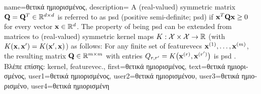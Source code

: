 {name={\foreignlanguage{greek}{θετικά ημιορισμένος}},
	description=
	{A (real-valued) symmetric matrix $\mathbf{Q} = \mathbf{Q}^{T} \in \mathbb{R}^{d \times d}$ 
	 is referred to as psd (positive semi-definite; psd) if ${\bf x}^{T} \mathbf{Q} {\bf x} \geq 0$ for every vector ${\bf x} \in \mathbb{R}^{d}$. 
	 The property of being psd can be extended from matrices to (real-valued) 
	 symmetric \gls{kernel} maps $K: \mathcal{X} \times \mathcal{X} \rightarrow \mathbb{R}$ 
	 (with $K({\bf x},{\bf x}') = K({\bf x}',{\bf x})$)
	 as follows: For any finite set of \gls{featurevec}s ${\bf x}^{(1)},\dots,{\bf x}^{(m)}$, 
	 the resulting matrix $\mathbf{Q} \in \mathbb{R}^{m \times m}$ with 
	entries $Q_{r,r'} = K\big({\bf x}^{(r)},{\bf x}^{(r')}\big)$ 
	is psd \cite{LearningKernelsBook}.\\
	\foreignlanguage{greek}{Βλέπε επίσης:} \gls{kernel}, \gls{featurevec}.},
	first={\foreignlanguage{greek}{θετικά ημιορισμένος}},
	text={\foreignlanguage{greek}{θετικά ημιορισμένος}},
	user1={\foreignlanguage{greek}{θετικά ημιορισμένος}}, %
  	user2={\foreignlanguage{greek}{θετικά ημιορισμένου}}, %
	user3={\foreignlanguage{greek}{θετικά ημιορισμένο}}, %
	user4={\foreignlanguage{greek}{θετικά ημιορισμένη}} %
}



